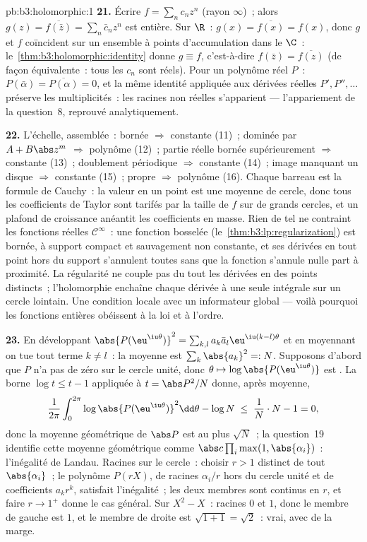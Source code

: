 \begin{solution}{pb:b3:holomorphic:1}
\textbf{21.} Écrire $f = \sum_nc_nz^n$ (rayon $\infty$)~;
alors $g(z) = \overline{f(\bar z)} = \sum_n\bar c_nz^n$ est
entière. Sur $\R$~: $g(x) = \overline{f(x)} = f(x)$, donc
$g$ et $f$ coïncident sur un ensemble à points
d'accumulation dans le  $\C$~:
le~\cref{thm:b3:holomorphic:identity} donne $g \equiv f$,
c'est-à-dire $f(\bar z) = \overline{f(z)}$ (de façon
équivalente~: tous les $c_n$ sont réels). Pour un polynôme
réel $P$~: $P(\bar\alpha) = \overline{P(\alpha)} = 0$, et
la même identité appliquée aux dérivées réelles $P', P'',
\dots$ préserve les multiplicités~: les racines non réelles
s'apparient --- l'appariement de la question~8, reprouvé
analytiquement.

\textbf{22.} L'échelle, assemblée~: bornée $\Rightarrow$
constante (11)~; dominée par $A + B\abs z^m$ $\Rightarrow$
polynôme (12)~; partie réelle bornée supérieurement
$\Rightarrow$ constante (13)~; doublement périodique
$\Rightarrow$ constante (14)~; image manquant un disque
$\Rightarrow$ constante (15)~; propre $\Rightarrow$
polynôme (16). Chaque barreau est la formule de Cauchy~: la
valeur en un point est une moyenne de cercle, donc tous les
coefficients de Taylor sont tarifés par la taille de $f$ sur
de grands cercles, et un plafond de croissance anéantit les
coefficients en masse. Rien de tel ne contraint les
fonctions réelles $\mathcal C^\infty$~: une fonction bosselée
(le~\cref{thm:b3:lp:regularization}) est bornée, à support
compact et sauvagement non constante, et ses dérivées en
tout point hors du support s'annulent toutes sans que la
fonction s'annule nulle part à proximité. La régularité ne
couple pas du tout les dérivées en des points distincts~;
l'holomorphie enchaîne chaque dérivée à une seule intégrale
sur un cercle lointain. Une condition locale avec un
informateur global --- voilà pourquoi les fonctions entières
obéissent à la loi et à l'ordre.

\textbf{23.} En développant $\abs{P(\eu^{\iu\theta})}^2 =
\sum_{k,l}a_k\bar a_l \eu^{\iu(k-l)\theta}$ et en moyennant
on tue tout terme $k \neq l$~: la moyenne est
$\sum_k\abs{a_k}^2 =: N$. Supposons d'abord que $P$ n'a pas
de zéro sur le cercle unité, donc $\theta \mapsto
\log\abs{P(\eu^{\iu\theta})}$ est . La borne $\log
t \leq t - 1$ appliquée à $t = \abs P^2/N$ donne, après
moyenne,
\[
\frac1{2\pi}\int_0^{2\pi}\log\abs{P(\eu^{\iu\theta})}^2
\dd\theta - \log N
\;\leq\; \frac1N\cdot N - 1 = 0,
\]
donc la moyenne géométrique de $\abs P$ est au plus $\sqrt
N$~; la question~19 identifie cette moyenne géométrique
comme $\abs c\prod_i\max(1, \abs{\alpha_i})$~: l'inégalité
de Landau. Racines sur le cercle~: choisir $r > 1$ distinct
de tout $\abs{\alpha_i}$~; le polynôme $P(rX)$, de racines
$\alpha_i/r$ hors du cercle unité et de coefficients
$a_kr^k$, satisfait l'inégalité~; les deux membres sont
continus en $r$, et faire $r \to 1^+$ donne le cas général.
Sur $X^2 - X$~: racines $0$ et $1$, donc le membre de gauche
est $1$, et le membre de droite est $\sqrt{1 + 1} =
\sqrt2$~: vrai, avec de la marge.


\end{solution}
